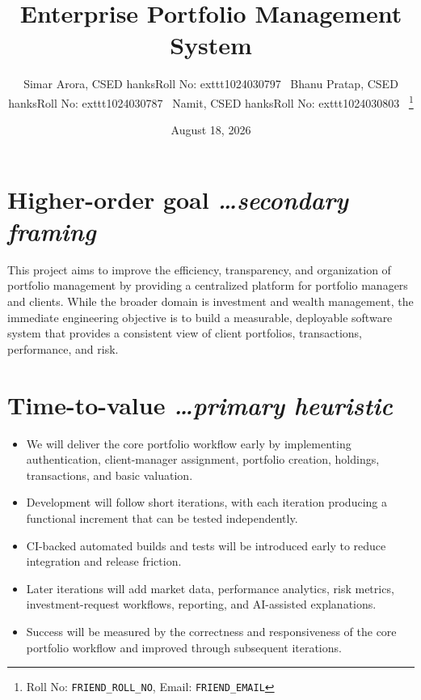 \documentclass[11pt,a4paper]{article}
\title{Enterprise Portfolio Management System}
\author{
Simar Arora, CSED	hanks{Roll No: 	exttt{1024030797}} \
Bhanu Pratap, CSED	hanks{Roll No: 	exttt{1024030787}} \
Namit, CSED	hanks{Roll No: 	exttt{1024030803}} \
\thanks{Roll No: \texttt{FRIEND\_ROLL\_NO}, Email: \texttt{FRIEND\_EMAIL}}
}
\date{August 18, 2026}
\newcommand{\BvrHint}[1]{{\normalfont\normalsize\itshape\hfill #1}}
\begin{document}
\maketitle

\section{Higher-order goal \BvrHint{\ldots secondary framing}}
This project aims to improve the efficiency, transparency, and organization of portfolio management by providing a centralized platform for portfolio managers and clients. While the broader domain is investment and wealth management, the immediate engineering objective is to build a measurable, deployable software system that provides a consistent view of client portfolios, transactions, performance, and risk.

\section{Time-to-value \BvrHint{\ldots primary heuristic}}
\begin{itemize}[leftmargin=0.7cm]
\item We will deliver the core portfolio workflow early by implementing authentication, client-manager assignment, portfolio creation, holdings, transactions, and basic valuation.
\item Development will follow short iterations, with each iteration producing a functional increment that can be tested independently.
\item CI-backed automated builds and tests will be introduced early to reduce integration and release friction.
\item Later iterations will add market data, performance analytics, risk metrics, investment-request workflows, reporting, and AI-assisted explanations.
\item Success will be measured by the correctness and responsiveness of the core portfolio workflow and improved through subsequent iterations.
\end{itemize}
\end{document}
